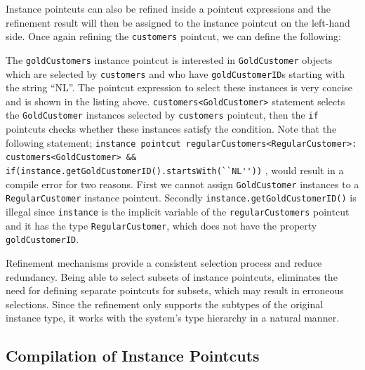\documentclass{llncs}
\begin{document}
Instance pointcuts can also be refined inside a pointcut expressions and the refinement result will then be assigned to the instance pointcut on the left-hand side. Once again refining the \texttt{customers} pointcut, we can define the following:






The \texttt{goldCustomers} instance pointcut is interested in \texttt{GoldCustomer} objects which are selected by \texttt{customers} and who have \texttt{goldCustomerID}s starting with the string ``NL''. The pointcut expression to select these instances is very concise and is shown in the listing above. \texttt{customers<GoldCustomer>} statement selects the \texttt{GoldCustomer} instances selected by \texttt{customers} pointcut, then the \texttt{if} pointcuts checks whether these instances satisfy the condition. Note that the following statement; \lstinline!instance pointcut regularCustomers<RegularCustomer>: customers<GoldCustomer> &&  if(instance.getGoldCustomerID().startsWith(``NL''))! , would result in a compile error for two reasons. First we cannot assign \texttt{GoldCustomer} instances to a \texttt{RegularCustomer} instance pointcut. Secondly \texttt{instance.getGoldCustomerID()} is illegal since \texttt{instance} is the implicit variable of the \texttt{regularCustomers} pointcut and it has the type \texttt{RegularCustomer}, which does not have the property \texttt{goldCustomerID}.

Refinement mechanisms provide a consistent selection process and reduce redundancy. Being able to select subsets of instance pointcuts, eliminates the need for defining separate pointcuts for subsets, which may result in erroneous selections. Since the refinement only supports the subtypes of the original instance type, it works with the system's type hierarchy in a natural manner. 


\subsection{Compilation of Instance Pointcuts}
\end{document}
